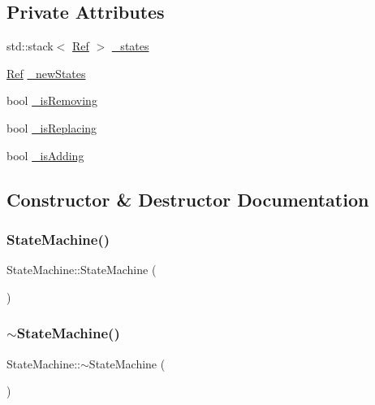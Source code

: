 \subsection*{Private Attributes}
\begin{DoxyCompactItemize}
\item 
std\+::stack$<$ \hyperlink{state__machine_8h_a6052c67656ab2e47e32df9051a84e8f4}{Ref} $>$ \hyperlink{classStateMachine_a30a1846aa7b38b026b01c6075c475946}{\+\_\+states}
\item 
\hyperlink{state__machine_8h_a6052c67656ab2e47e32df9051a84e8f4}{Ref} \hyperlink{classStateMachine_a6be0d507a29fbee40d335d7a47a9122f}{\+\_\+new\+States}
\item 
bool \hyperlink{classStateMachine_a08cb3324baf98cd027565aaee67ab016}{\+\_\+is\+Removing}
\item 
bool \hyperlink{classStateMachine_abb01bcc9617e9978db7afc34e03ba8d8}{\+\_\+is\+Replacing}
\item 
bool \hyperlink{classStateMachine_a806fb4068124f055f628e3563b4ca9b1}{\+\_\+is\+Adding}
\end{DoxyCompactItemize}


\subsection{Constructor \& Destructor Documentation}
\mbox{\label{classStateMachine_a2fb07002510ea9141019559750acfab8}} 
\subsubsection{\texorpdfstring{State\+Machine()}{StateMachine()}}
{\footnotesize\ttfamily State\+Machine\+::\+State\+Machine (\begin{DoxyParamCaption}{ }\end{DoxyParamCaption})\hspace{0.3cm}{\ttfamily [inline]}}

\mbox{\label{classStateMachine_a93d66cb2a89b186789d655a08b02674e}} 
\subsubsection{\texorpdfstring{$\sim$\+State\+Machine()}{~StateMachine()}}
{\footnotesize\ttfamily State\+Machine\+::$\sim$\+State\+Machine (\begin{DoxyParamCaption}{ }\end{DoxyParamCaption})\hspace{0.3cm}{\ttfamily [inline]}}



